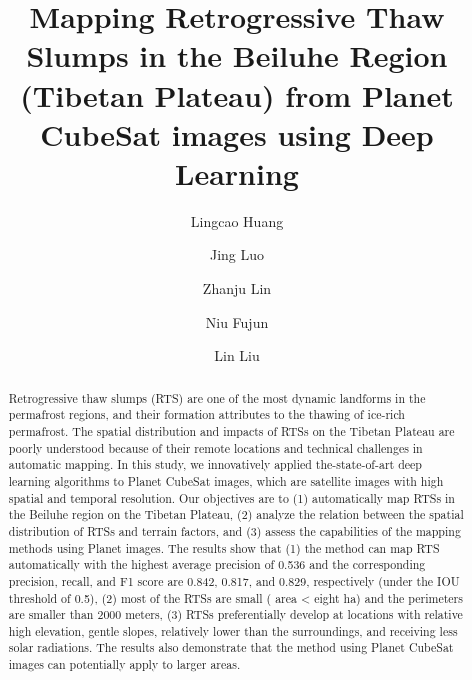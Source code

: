 \documentclass[preprint,12pt,authoryear]{elsarticle}
\begin{document}
\begin{frontmatter}




\title{Mapping Retrogressive Thaw Slumps in the Beiluhe Region (Tibetan Plateau) from Planet CubeSat images using Deep Learning}


\author[a]{Lingcao Huang}
\author[b]{Jing Luo}
\author[b]{Zhanju Lin}
\author[b]{Niu Fujun}
\author[a]{Lin Liu}


\address[a]{Earth System Science Programme, Faculty of Science, The Chinese University of Hong Kong, Hong Kong SAR, China.}
\address[b]{Northwest Institute of Eco-Environment and Resources, Chinese Academy of Sciences, LanZhou, China.}

\begin{abstract}

Retrogressive thaw slumps (RTS) are one of the most dynamic landforms in the permafrost regions, and their formation attributes to the thawing of ice-rich permafrost. The spatial distribution and impacts of RTSs on the Tibetan Plateau are poorly understood because of their remote locations and technical challenges in automatic mapping. In this study, we innovatively applied the-state-of-art deep learning algorithms to Planet CubeSat images, which are satellite images with high spatial and temporal resolution. Our objectives are to (1) automatically map RTSs in the Beiluhe region on the Tibetan Plateau, (2) analyze the relation between the spatial distribution of RTSs and terrain factors, and (3) assess the capabilities of the mapping methods using Planet images. The results show that (1) the method can map RTS automatically with the highest average precision of 0.536 and the corresponding precision, recall, and F1 score are 0.842, 0.817, and 0.829, respectively (under the IOU threshold of 0.5), (2) most of the RTSs are small ( area < eight ha) and the perimeters are smaller than 2000 meters, (3) RTSs preferentially develop at locations with relative high elevation, gentle slopes, relatively lower than the surroundings, and receiving less solar radiations. The results also demonstrate that the method using Planet CubeSat images can potentially apply to larger areas.  %


\end{abstract}
\end{frontmatter}
\end{document}
